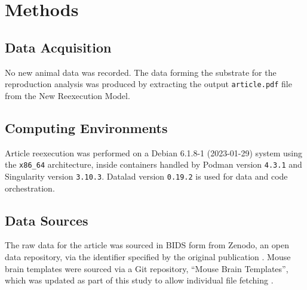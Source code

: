 \section{Methods}


\subsection{Data Acquisition}

No new animal data was recorded.
The data forming the substrate for the reproduction analysis was produced by extracting the output \texttt{article.pdf} file from the New Reexecution Model.

\subsection{Computing Environments}
Article reexecution was performed on a Debian 6.1.8-1 (2023-01-29) system using the \texttt{x86\_64} architecture, inside containers handled by Podman version \texttt{4.3.1} and Singularity version \texttt{3.10.3}.
Datalad version \texttt{0.19.2} is used for data and code orchestration.


\subsection{Data Sources}
The raw data for the article was sourced in BIDS form from Zenodo, an open data repository, via the identifier specified by the original publication \cite{opfvta_bidsdata}.
Mouse brain templates were sourced via a Git repository, “Mouse Brain Templates”, which was updated as part of this study to allow individual file fetching \cite{mbt10}.



